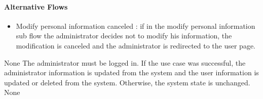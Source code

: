 {\begin{itemize}
    \paragraph{Alternative Flows}
    \begin{itemize}
      \item Modify personal information canceled : if in the modify personal information sub flow the administrator decides not to modify his information, the modification is canceled and the administrator is redirected to the user page.
    \end{itemize}
  \end{itemize}

}
{None}
{The administrator must be logged in.}
{
  If the use case was successful, the administrator information is updated from the system and the user information is updated or deleted from the system. Otherwise, the system state is unchanged.
}
{None}
